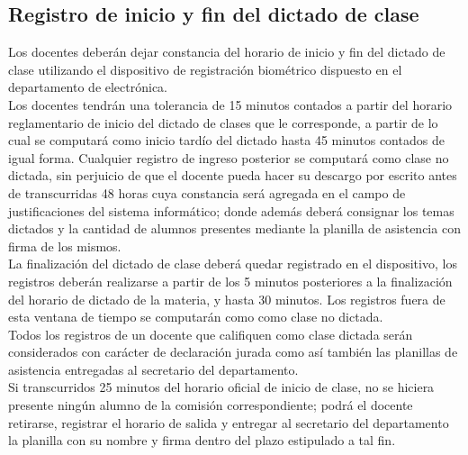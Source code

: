 \documentclass[a4paper, 11pt]{article} %
\begin{document}
\subsection{Registro de inicio y fin del dictado de clase}
Los docentes deberán dejar constancia del horario de inicio y fin del dictado de clase utilizando el dispositivo de registración biométrico dispuesto en el departamento de electrónica.\\
Los docentes tendrán una tolerancia de 15 minutos contados a partir del horario reglamentario de inicio del dictado de clases que le corresponde, a partir de lo cual se computará como inicio tardío del dictado hasta 45 minutos contados de igual forma. Cualquier registro de ingreso posterior se computará como clase no dictada, sin perjuicio de que el docente pueda hacer su descargo por escrito antes de transcurridas 48 horas cuya constancia será agregada en el campo de justificaciones del sistema informático; donde además deberá consignar los temas dictados y la cantidad de alumnos presentes mediante la planilla de asistencia con firma de los mismos.\\
La finalización del dictado de clase deberá quedar registrado en el dispositivo, los registros deberán realizarse a partir de los 5 minutos posteriores a la finalización del horario de dictado de la materia, y hasta 30 minutos. Los registros fuera de esta ventana de tiempo se computarán como como clase no dictada.\\
Todos los registros de un docente que califiquen como clase dictada serán considerados con carácter de declaración jurada como así también las planillas de asistencia entregadas al secretario del departamento.\\
Si transcurridos 25 minutos del horario oficial de inicio de clase, no se hiciera presente ningún alumno de la comisión correspondiente; podrá el docente retirarse, registrar el horario de salida y entregar al secretario del departamento la planilla con su nombre y firma dentro del plazo estipulado a tal fin.\\
\end{document}
